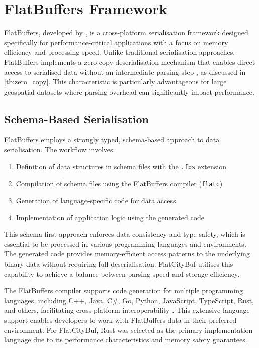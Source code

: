 
\section{FlatBuffers Framework}
\label{rw_tb:fb}

FlatBuffers, developed by \citet{flatbuffers}, is a cross-platform serialisation framework designed specifically for performance-critical applications with a focus on memory efficiency and processing speed. Unlike traditional serialisation approaches, FlatBuffers implements a zero-copy deserialisation mechanism that enables direct access to serialised data without an intermediate parsing step \citep{flatbuffers_benchmark}, as discussed in \autoref{tb:zero_copy}. This characteristic is particularly advantageous for large geospatial datasets where parsing overhead can significantly impact performance.

\subsection{Schema-Based Serialisation}
\label{rw_tb:fb:schema_based_serialisation}

FlatBuffers employs a strongly typed, schema-based approach to data serialisation. The workflow involves:

\begin{enumerate}
    \item Definition of data structures in schema files with the \texttt{.fbs} extension
    \item Compilation of schema files using the FlatBuffers compiler (\texttt{flatc})
    \item Generation of language-specific code for data access
    \item Implementation of application logic using the generated code
\end{enumerate}

This schema-first approach enforces data consistency and type safety, which is essential to be processed in various programming languages and environments. The generated code provides memory-efficient access patterns to the underlying binary data without requiring full deserialisation. FlatCityBuf utilises this capability to achieve a balance between parsing speed and storage efficiency.

The FlatBuffers compiler supports code generation for multiple programming languages, including C++, Java, C\#, Go, Python, JavaScript, TypeScript, Rust, and others, facilitating cross-platform interoperability \citep{flatbuffers_support}. This extensive language support enables developers to work with FlatBuffers data in their preferred environment. For FlatCityBuf, Rust was selected as the primary implementation language due to its performance characteristics and memory safety guarantees.

